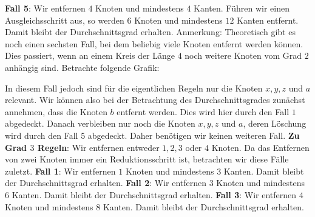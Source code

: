 \documentclass[12pt,onecolumn, notitlepage]{scrartcl}
\begin{document}
\textbf{Fall 5}: Wir entfernen $4$ Knoten und mindestens $4$ Kanten. Führen wir einen Ausgleichsschritt aus, so werden $6$ Knoten und mindestens $12$ Kanten entfernt. Damit bleibt der Durchschnittsgrad erhalten.\newline
Anmerkung: Theoretisch gibt es noch einen sechsten Fall, bei dem beliebig viele Knoten entfernt werden können. Dies passiert, wenn an einem Kreis der Länge $4$ noch weitere Knoten vom Grad $2$ anhängig sind. Betrachte folgende Grafik:\newline
\begin{center}
\end{center}
In diesem Fall jedoch sind für die eigentlichen Regeln nur die Knoten $x,y,z$ und $a$ relevant. Wir können also bei der Betrachtung des Durchschnittsgrades zunächst annehmen, dass die Knoten $b$ entfernt werden. Dies wird hier durch den Fall $1$ abgedeckt. Danach verbleiben nur noch die Knoten $x,y,z$ und $a$, deren Löschung wird durch den Fall 5 abgedeckt. Daher benötigen wir keinen weiteren Fall.\newline \newline
\textbf{Zu Grad $3$ Regeln}:\newline
Wir entfernen entweder $1,2,3$ oder $4$ Knoten. Da das Entfernen von zwei Knoten immer ein Reduktionsschritt ist, betrachten wir diese Fälle zuletzt.\newline \newline
\textbf{Fall 1}: Wir entfernen $1$ Knoten und mindestens $3$ Kanten. Damit bleibt der Durchschnittsgrad erhalten. \newline
\textbf{Fall 2}: Wir entfernen $3$ Knoten und mindestens $6$ Kanten. Damit bleibt der Durchschnittsgrad erhalten.\newline
\textbf{Fall 3}: Wir entfernen $4$ Knoten und mindestens $8$ Kanten. Damit bleibt der Durchschnittsgrad erhalten.\newline
\end{document}
